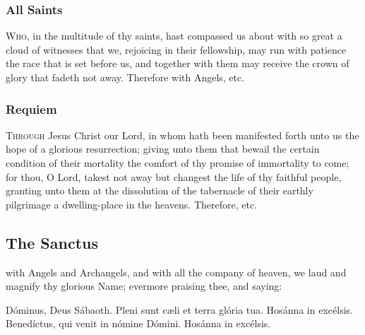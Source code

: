 \subsubsection{All Saints}
\textsc{Who,} in the multitude of thy saints, hast compassed us about with so great a cloud of witnesses that we, rejoicing in their fellowship, may run with patience the race that is set before us, and together with them may receive the crown of glory that fadeth not away.
    Therefore with Angels, etc.
\subsubsection{Requiem}
\textsc{Through} Jesus Christ our Lord, in whom hath been manifested forth unto us the hope of a glorious resurrection; giving unto them that bewail the certain condition of their mortality the comfort of thy promise of immortality to come; for thou, O Lord, takest not away but changest the life of thy faithful people, granting unto them at the dissolution of the tabernacle of their earthly pilgrimage a dwelling-place in the heavens. Therefore, etc.
\subsection{The Sanctus}
 with Angels and Archangels, and with all the company of heaven, we laud and magnify thy glorious Name; evermore praising thee, and saying:
\par
\noindent
{}
{
 Dóminus, Deus Sábaoth. Pleni sunt c{\ae}li et terra glória tua. Hosánna in excélsis. Benedíctus, {} qui venit in nómine Dómini. Hosánna in excélsis.
}
